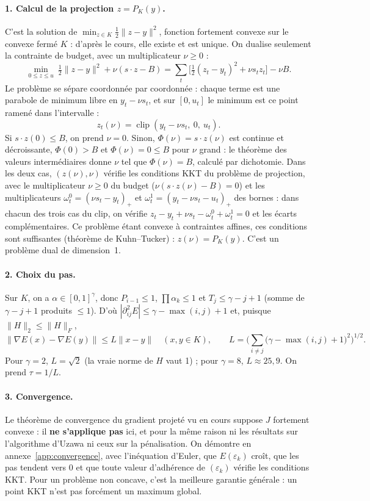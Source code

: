 \documentclass[11pt,a4paper]{article}
\newcommand{\nr}[1]{\|#1\|}
\newcommand{\clip}{\operatorname{clip}}
\theoremstyle{plain}
\theoremstyle{definition}
\begin{document}
\paragraph{1. Calcul de la projection $z=P_K(y)$.} C'est la solution de $\min_{z\in K}\tfrac12\nr{z-y}^2$, fonction fortement convexe sur le convexe fermé $K$ : d'après le cours, elle existe et est unique. On dualise seulement la contrainte de budget, avec un multiplicateur $\nu\ge0$ :
\[\min_{0\le z\le u}\ \tfrac12\nr{z-y}^2+\nu(s\cdot z-B)=\sum_t\Big[\tfrac12(z_t-y_t)^2+\nu s_tz_t\Big]-\nu B.\]
Le problème se sépare coordonnée par coordonnée : chaque terme est une parabole de minimum libre en $y_t-\nu s_t$, et sur $[0,u_t]$ le minimum est ce point ramené dans l'intervalle :
\[z_t(\nu)=\clip(y_t-\nu s_t,\ 0,\ u_t).\]
Si $s\cdot z(0)\le B$, on prend $\nu=0$. Sinon, $\Phi(\nu)=s\cdot z(\nu)$ est continue et décroissante, $\Phi(0)>B$ et $\Phi(\nu)=0\le B$ pour $\nu$ grand : le théorème des valeurs intermédiaires donne $\nu$ tel que $\Phi(\nu)=B$, calculé par dichotomie.
Dans les deux cas, $(z(\nu),\nu)$ vérifie les conditions KKT du problème de projection, avec le multiplicateur $\nu\ge0$ du budget ($\nu(s\cdot z(\nu)-B)=0$) et les multiplicateurs $\omega^0_t=(\nu s_t-y_t)_+$ et $\omega^1_t=(y_t-\nu s_t-u_t)_+$ des bornes : dans chacun des trois cas du clip, on vérifie $z_t-y_t+\nu s_t-\omega^0_t+\omega^1_t=0$ et les écarts complémentaires. Ce problème étant convexe à contraintes affines, ces conditions sont suffisantes (théorème de Kuhn--Tucker) : $z(\nu)=P_K(y)$. C'est un problème dual de dimension~1.

\paragraph{2. Choix du pas.} Sur $K$, on a $\alpha\in[0,1]^\gamma$, donc $P_{i-1}\le1$, $\prod\alpha_k\le1$ et $T_j\le\gamma-j+1$ (somme de $\gamma-j+1$ produits $\le1$). D'où $|\partial^2_{ij}E|\le\gamma-\max(i,j)+1$ et, puisque $\nr{H}_2\le\nr{H}_F$,
\[\nr{\nabla E(x)-\nabla E(y)}\le L\nr{x-y}\quad(x,y\in K),\qquad L=\Big(\sum_{i\ne j}\big(\gamma-\max(i,j)+1\big)^2\Big)^{1/2}.\]
Pour $\gamma=2$, $L=\sqrt2$ (la vraie norme de $H$ vaut 1) ; pour $\gamma=8$, $L\approx25{,}9$. On prend $\tau=1/L$.

\paragraph{3. Convergence.} Le théorème de convergence du gradient projeté vu en cours suppose $J$ fortement convexe : il \textbf{ne s'applique pas} ici, et pour la même raison ni les résultats sur l'algorithme d'Uzawa ni ceux sur la pénalisation. On démontre en annexe~\ref{app:convergence}, avec l'inéquation d'Euler, que $E(\varepsilon_k)$ croît, que les pas tendent vers 0 et que toute valeur d'adhérence de $(\varepsilon_k)$ vérifie les conditions KKT. Pour un problème non concave, c'est la meilleure garantie générale : un point KKT n'est pas forcément un maximum global.
\end{document}
